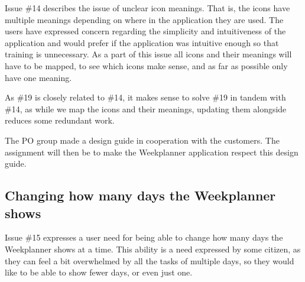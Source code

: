 Issue \#14 describes the issue of unclear icon meanings. That is, the icons have multiple meanings depending on where in the application they are used. The users have expressed concern regarding the simplicity and intuitiveness of the application and would prefer if the application was intuitive enough so that training is unnecessary. As a part of this issue all icons and their meanings will have to be mapped, to see which icons make sense, and as far as possible only have one meaning. 

As \#19 is closely related to \#14, it makes sense to solve \#19 in tandem with \#14, as while we map the icons and their meanings, updating them alongside reduces some redundant work.

The \gls{PO} group made a design guide in cooperation with the customers. The assignment will then be to make the Weekplanner application respect this design guide.

\subsection{Changing how many days the Weekplanner shows} \label{sec:weekPlannerDaysToShow}

Issue \#15 expresses a user need for being able to change how many days the Weekplanner shows at a time. This ability is a need expressed by some citizen, as they can feel a bit overwhelmed by all the tasks of multiple days, so they would like to be able to show fewer days, or even just one.
